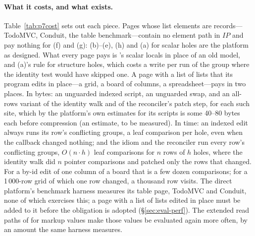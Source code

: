 \paragraph{What it costs, and what exists.} Table~\ref{tab:p7cost} sets out each piece. Pages whose list
elements are records---TodoMVC, Conduit, the table benchmark---contain no element path in
$\mathit{IP}$ and pay nothing for (f) and (g): (b)--(e), (h) and (a) for scalar holes are the platform as
designed. What every page pays is 's scalar locals in place of an old model, and (a)'s rule for
structure holes, which costs a write per run of the group where the identity test would have skipped
one. A page with a list of lists
that its program edits in place---a grid, a board of columns, a spreadsheet---pays in two places. In bytes:
an unguarded indexed script, an unguarded swap, and an all-rows variant of the identity walk and of the
reconciler's patch step, for each such  site, which by the platform's own estimates for its
scripts is some 40--80 bytes each before compression (an estimate, to be measured). In time: an indexed
edit always runs its row's conflicting groups, a leaf comparison per hole, even when the callback changed
nothing; and the  idiom and the reconciler run every row's conflicting groups, $O(n \cdot h)$ leaf
comparisons for $n$ rows of $h$ holes, where the identity walk did $n$ pointer comparisons and patched only
the rows that changed. For a by-id  edit of one column of a board that is a few dozen
comparisons; for a 1\,000-row grid of which one row changed, a thousand row visits. The direct platform's
benchmark harness measures its table page, TodoMVC and Conduit, none of which exercises this; a page with
a list of lists edited in place must be added to it before the obligation is adopted (\S\ref{sec:eval-perf}).
The extended read paths of  for markup values make those values be evaluated again more often,
by an amount the same harness measures.

